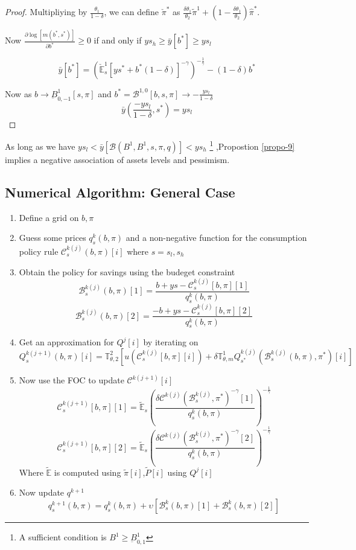 \documentclass[12pt]{article}
\begin{document}
\begin{proof}
Multipliying by $\frac{\theta_1}{1-\delta}$, we can define $\check{\pi}^{*}$ as $\frac{\delta \theta_1}{\theta_2}\tilde{\pi}^1+\left(1- \frac{\delta \theta_1}{\theta_2}\right)\hat{\pi}^*$.

Now $\frac{\partial \log[m(b^*,s^*)]}{\partial b^*} \geq 0$ if and only if $ys_h\geq \bar{y}[b^*]\geq ys_l$

\[\bar{y}[b^*]=\left(\check{\mathbb{E}}^{1}_{s} [ys^{*}+b^*(1-\delta)]^{-\gamma}\right)^{-\frac{1}{\gamma}} -(1-\delta)b^*\]


Now as $b\to \underbar{B}^1_{0,-1}[s,\pi]$ and $b^*=\mathcal{B}^{1,0}[b,s,\pi]\to -\frac{ys_l}{1-\delta}$
\[\bar{y}\left(\frac{-ys_l}{1-\delta},s^*\right)=ys_l\]
\end{proof}
As long as we have $ys_l< \bar{y}[\mathcal{B}(B^1,B^{1},s,\pi,q)]<ys_h$ \footnote{A sufficient condition is $B^{1} \geq \underbar{B}^{1}_{0,1}$} ,Propostion \ref{propo-9} implies a negative association of assets levels and pessimism. 
\subsection{Numerical Algorithm: General Case}

\begin{enumerate}
	\item Define a grid on $b,\pi$
	\item Guess some prices $q^k_{s}(b,\pi)$ and a non-negative function for the consumption policy rule $\mathcal{C}_{s}^{k(j)}(b,\pi)[i]$ where $s=s_l,s_h$
	\item Obtain the policy for savings using the budeget constraint 
	\[\mathcal{B}^{k(j)}_s(b,\pi)[1] = \frac{b+ys-\mathcal{C}^{k(j)}_{s}[b,\pi][1]}{q^k_{s}(b,\pi)}\]
	\[\mathcal{B}^{k(j)}_s(b,\pi)[2] = \frac{-b+ys-\mathcal{C}^{k(j)}_{s}[b,\pi][2]}{q^k_{s}(b,\pi)}\]
	\item Get an approximation for $Q^j[i]$ by iterating on 	\[Q^{k(j+1)}_{s}(b,\pi)[i]={\mathbb{T}^2_{\theta,2}\left[u(\mathcal{C}^{k(j)}_s[b,\pi][i])+\delta\mathbb{T}^{1}_{\theta,m}Q_{s^*}^{k(j)}(\mathcal{B}^{k(j)}_{s}(b,\pi),\pi^*)[i]\right]}\] 
\item Now use the FOC to update $\mathcal{C}^{k(j+1)}[i]$
\[\mathcal{C}^{k(j+1)}_{s}[b,\pi][1]=\tilde{\mathbb{E}}_{s}\left(\frac{\delta \mathcal{C}^{k(j)}(\mathcal{B}^{k(j)}_{s},\pi^*)^{-\gamma}[1]}{q^k_{s}(b,\pi)}\right)^{-\frac{1}{\gamma}}\]
\[\mathcal{C}^{k(j+1)}_{s}[b,\pi][2]=\tilde{\mathbb{E}}_{s}\left(\frac{\delta \mathcal{C}^{k(j)}(\mathcal{B}^{k(j)}_{s},\pi^*)^{-\gamma}[2]}{q^k_{s}(b,\pi)}\right)^{-\frac{1}{\gamma}}\]
Where $\tilde{\mathbb{E}}$ is computed using $\tilde{\pi}[i]$,$\tilde{P}[i]$ using $Q^j[i]$
	\item Now update $q^{k+1}$
	\[q^{k+1}_{s}(b,\pi)= q^{k}_{s}(b,\pi)+\upsilon\left[\mathcal{B}^{k}_s(b,\pi)[1]+\mathcal{B}^{k}_{s}(b,\pi)[2]\right]\]
	
\end{enumerate}
\end{document}
